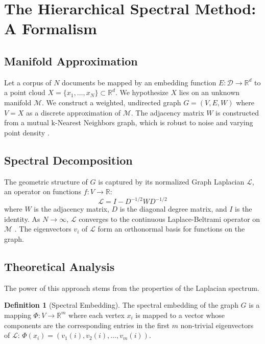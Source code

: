 \documentclass[conference]{IEEEtran}
\theoremstyle{definition}
\newtheorem{definition}{Definition}
\begin{document}
\section{The Hierarchical Spectral Method: A Formalism}

\subsection{Manifold Approximation}
Let a corpus of $N$ documents be mapped by an embedding function $E: \mathcal{D} \to \mathbb{R}^d$ to a point cloud $X = \{x_1, \dots, x_N\} \subset \mathbb{R}^d$. We hypothesize $X$ lies on an unknown manifold $\mathcal{M}$. We construct a weighted, undirected graph $G=(V, E, W)$ where $V=X$ as a discrete approximation of $\mathcal{M}$. The adjacency matrix $W$ is constructed from a mutual k-Nearest Neighbors graph, which is robust to noise and varying point density \cite{tenenbaum2000global}.

\subsection{Spectral Decomposition}
The geometric structure of $G$ is captured by its normalized Graph Laplacian $\mathcal{L}$, an operator on functions $f: V \to \mathbb{R}$:
\begin{equation}
\mathcal{L} = I - D^{-1/2} W D^{-1/2}
\end{equation}
where $W$ is the adjacency matrix, $D$ is the diagonal degree matrix, and $I$ is the identity. As $N \to \infty$, $\mathcal{L}$ converges to the continuous Laplace-Beltrami operator on $\mathcal{M}$ \cite{chung1997spectral}. The eigenvectors $v_i$ of $\mathcal{L}$ form an orthonormal basis for functions on the graph.

\subsection{Theoretical Analysis}
The power of this approach stems from the properties of the Laplacian spectrum.

\begin{definition}[Spectral Embedding]
The spectral embedding of the graph $G$ is a mapping $\Phi: V \to \mathbb{R}^m$ where each vertex $x_i$ is mapped to a vector whose components are the corresponding entries in the first $m$ non-trivial eigenvectors of $\mathcal{L}$: $\Phi(x_i) = (v_1(i), v_2(i), \dots, v_m(i))$.
\end{definition}
\end{document}
